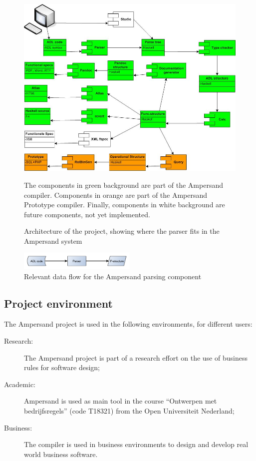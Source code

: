 \begin{figure}[htb]
	\centering
	\includegraphics[width=\textwidth]{Figures/ADL_systeemarchitectuur}
	\caption[Architecture of the project]{Architecture of the project, showing where the parser fits in the Ampersand system}
	\label{fig:architecture}
	\small
	The components in green background are part of the Ampersand compiler.
	Components in orange are part of the Ampersand Prototype compiler.
	Finally, components in white background are future components, not yet implemented.
\end{figure}
%
\begin{figure}[htb]
	\centering
	\includegraphics[width=0.5\textwidth]{Figures/Architecture}
	\caption{Relevant data flow for the Ampersand parsing component}
	\label{fig:data-flow}
\end{figure}

\subsection{Project environment}
The Ampersand project is used in the following environments, for different users:
\begin{description}
	\item[Research:] The Ampersand project is part of a research effort on the use of business rules for software design;
	\item[Academic:] Ampersand is used as main tool in the course ``Ontwerpen met bedrijfsregels'' (code T18321) from the Open Universiteit Nederland;
	\item[Business:] The compiler is used in business environments to design and develop real world business software.
\end{description}

